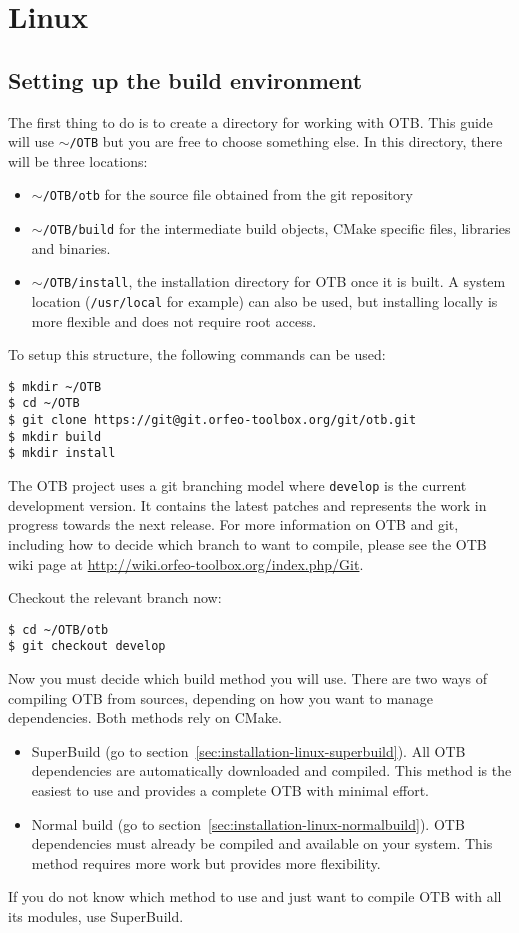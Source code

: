 \section{Linux}
\label{sec:compiling-linux}

\subsection{Setting up the build environment}

The first thing to do is to create a directory for working with OTB.
This guide will use \texttt{$\sim$/OTB} but you are free to choose something else.
In this directory, there will be three locations:
\begin{itemize}
\item \texttt{$\sim$/OTB/otb} for the source file obtained from the git repository
\item \texttt{$\sim$/OTB/build} for the intermediate build objects, CMake specific files, libraries and binaries.
\item \texttt{$\sim$/OTB/install}, the installation directory for OTB once it is built.
A system location (\texttt{/usr/local} for example) can also be used, but installing locally is more flexible and does
not require root access.
\end{itemize}
To setup this structure, the following commands can be used:
\begin{verbatim}
$ mkdir ~/OTB
$ cd ~/OTB
$ git clone https://git@git.orfeo-toolbox.org/git/otb.git
$ mkdir build
$ mkdir install
\end{verbatim}

The OTB project uses a git branching model where \texttt{develop} is the current development version.
It contains the latest patches and represents the work in progress towards the next release.
For more information on OTB and git, including how to decide which branch to want to compile, please see the
OTB wiki page at \url{http://wiki.orfeo-toolbox.org/index.php/Git}.

Checkout the relevant branch now:
\begin{verbatim}
$ cd ~/OTB/otb
$ git checkout develop
\end{verbatim}

Now you must decide which build method you will use.
There are two ways of compiling OTB from sources, depending on how you want to manage dependencies.
Both methods rely on CMake.
\begin{itemize}
\item SuperBuild (go to section~\ref{sec:installation-linux-superbuild}). All OTB dependencies are automatically downloaded and compiled.
This method is the easiest to use and provides a complete OTB with minimal effort.
\item Normal build (go to section~\ref{sec:installation-linux-normalbuild}). OTB dependencies must already be compiled and available on your system.
This method requires more work but provides more flexibility.
\end{itemize}
If you do not know which method to use and just want to compile OTB with all its modules, use SuperBuild.


